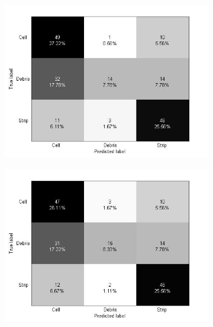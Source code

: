 \begin{figure}[!h]
\centering
  \begin{subfigure}[b]{0.3\textwidth}
    \includegraphics[width=\textwidth]{confusion_matrix/fig3_4a.jpg}
    \caption{}
  \end{subfigure}
  \begin{subfigure}[b]{0.3\textwidth}
    \includegraphics[width=\textwidth]{confusion_matrix/fig3_4b.jpg}
    \caption{}
  \end{subfigure}
  \begin{subfigure}[b]{0.3\textwidth}

\end{subfigure}
\end{figure}
